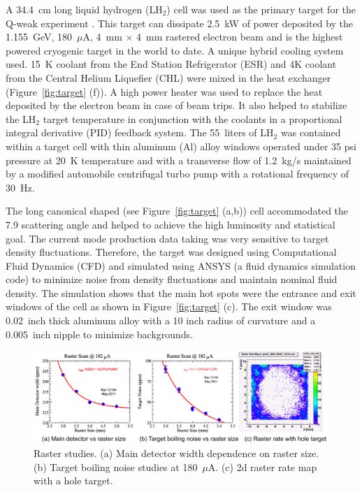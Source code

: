 A 34.4~cm long liquid hydrogen (LH$_{2}$) cell was used as the primary target for the Q-weak experiment \cite{greg_target_hydrogen}. This target can dissipate 2.5~kW of power deposited by the 1.155~GeV, 180~$\mu$A, 4~mm $\times$ 4~mm rastered 
electron beam and is the highest powered cryogenic target in the world to date. A unique hybrid cooling system used.  15~K coolant from the End Station Refrigerator (ESR) and 4K coolant from the Central Helium Liquefier (CHL) were mixed in the heat exchanger (Figure~\ref{fig:target} (f)). A high power heater was used to replace the heat deposited by the electron beam in case of beam trips. It also helped to stabilize the LH$_{2}$ target temperature in conjunction with the coolants in a proportional integral derivative (PID) feedback system. The 55~liters of LH$_{2}$ was contained within a target cell with thin aluminum (Al) alloy windows operated under 35 psi pressure at 20~K temperature and with a transverse flow of 1.2~kg/s maintained by a modified automobile centrifugal turbo pump with a rotational frequency of 30~Hz. 

The long canonical shaped (see Figure~\ref{fig:target} (a,b)) cell accommodated the 7.9\degrees{} scattering angle and helped to achieve the high luminosity and statistical goal. The current mode production data taking was very sensitive to target density fluctuations.  Therefore, the target was designed using Computational Fluid Dynamics (CFD) and simulated using ANSYS \cite{website:ansys} (a fluid dynamics simulation code) to minimize noise from density fluctuations and maintain nominal fluid density. The simulation shows that the main hot spots were the entrance and exit windows of the cell as shown in Figure~\ref{fig:target} (c). The exit window was 0.02~inch thick aluminum alloy with a 10 inch radius of curvature and a 0.005~inch nipple to minimize backgrounds.


\begin{singlespace}
\begin{figure}[!h]
	\begin{center}
	\includegraphics[width=15cm]{figures/raster}
	\caption
	{Raster studies. (a) Main detector width dependence on raster size. (b) Target boiling noise studies at 180~$\mu$A\cite{kmyers_qweak}. (c) 2d raster rate map with a hole target.}
	\label{fig:raster}
	\end{center}
\end{figure}
\end{singlespace}

